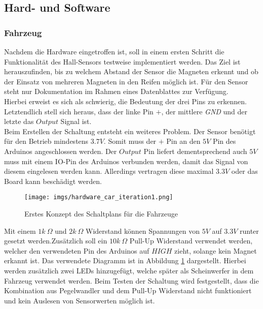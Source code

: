 \documentclass[.../Dokumentation.tex]{subfiles}
\begin{document}
\subsection{Hard- und Software}
\label{sec-ita1-hardware}

\subsubsection*{Fahrzeug}
Nachdem die Hardware eingetroffen ist, soll in einem ersten Schritt 
die Funktionalität des Hall-Sensors testweise implementiert werden. Das Ziel 
ist herauszufinden, bis zu welchem Abstand der Sensor die Magneten erkennt und 
ob der Einsatz von mehreren Magneten in den Reifen möglich ist. Für den Sensor 
steht nur Dokumentation im Rahmen eines Datenblattes zur Verfügung.\\
Hierbei erweist es sich als schwierig, die Bedeutung der drei Pins zu 
erkennen. Letztendlich stell sich heraus, dass der linke Pin $+$, der 
mittlere \textit{GND} und der letzte das $Output$ Signal ist.\\
Beim Erstellen der Schaltung entsteht ein weiteres Problem. Der Sensor benötigt für den Betrieb mindestens $3.7V$. Somit muss der $+$ Pin an den $5V$ Pin des 
Arduinos angeschlossen werden. Der $Output$ Pin liefert dementsprechend auch $5V$ muss mit einem IO-Pin des Arduinos verbunden werden, damit das 
Signal von diesem eingelesen werden kann. Allerdings vertragen diese maximal $3.3V$ 
oder das Board kann beschädigt werden.
\begin{figure}[H]
\begin{center}
    \texttt{[image: imgs/hardware\_car\_iteration1.png]}
    \caption{Erstes Konzept des Schaltplans für die Fahrzeuge}
    \label{fig-hardware-car-iteration1}
\end{center}
\end{figure}
\noindent
Mit einem $1k\ \Omega$ und $2k\ \Omega$ Widerstand können Spannungen von $5V$ 
auf $3.3V$ runter gesetzt werden.Zusätzlich soll ein 
$10k\ \Omega$ Pull-Up Widerstand verwendet werden, welcher den verwendeten Pin 
des Arduinos auf $HIGH$ zieht, solange kein Magnet erkannt ist. Das verwendete 
Diagramm ist in Abbildung \ref{fig-hardware-car-iteration1} dargestellt. 
Hierbei werden zusätzlich zwei LEDs hinzugefügt, welche später als Scheinwerfer in 
dem Fahrzeug verwendet werden. Beim Testen der Schaltung wird festgestellt, dass die Kombination aus Pegelwandler und dem Pull-Up Widerstand nicht funktioniert und kein Auslesen von Sensorwerten möglich ist.
\end{document}
